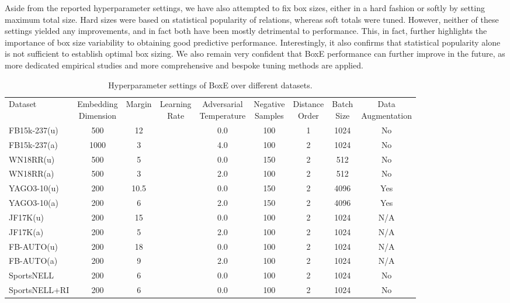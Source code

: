 \documentclass{article}
\begin{document}
Aside from the reported hyperparameter settings, we have also attempted  to fix box sizes, either in a hard fashion or softly by setting maximum total size. Hard sizes were based on statistical popularity of relations, whereas soft totals were tuned. However, neither of these settings yielded any improvements, and in fact both have been mostly detrimental to performance. This, in fact, further highlights the importance of box size variability to obtaining good predictive performance. Interestingly, it also confirms that statistical popularity alone is not sufficient to establish optimal box sizing. We also remain very confident that BoxE performance can further improve in the future, as more dedicated empirical studies and more comprehensive and bespoke tuning methods are applied. 
\begin{table}[t!] 
	\centering
	\caption{Hyperparameter settings of BoxE over different datasets.} 
	\label{tab:HPSettings} 
	\small\addtolength{\tabcolsep}{-1pt}
	\begin{tabular}{l@{\hskip 6pt}c@{\hskip 4pt}c@{\hskip 4pt}c@{\hskip 4pt}c@{\hskip 4pt}c@{\hskip 4pt}c@{\hskip 4pt}c@{\hskip 4pt}c@{\hskip 4pt}}
		\toprule 
		Dataset & \makecell[l]{Embedding \\ Dimension} & Margin & \makecell[l]{Learning \\ Rate} & \makecell[l]{Adversarial \\ Temperature} & \makecell[l]{Negative \\Samples } & \makecell[l]{Distance \\ Order} & \makecell[l]{Batch \\ Size} & \makecell[l]{Data \\ Augmentation}\\
		\cmidrule{2-9}
		FB15k-237(u) & 500 & 12 &  & 0.0 & 100 & 1 & 1024 & No\\
		FB15k-237(a) & 1000 & 3 &  & 4.0 & 100 & 2 & 1024 & No\\
		WN18RR(u) & 500 & 5 &  & 0.0 & 150 & 2 & 512 & No\\
		WN18RR(a) & 500 & 3 &  & 2.0 & 100 & 2 & 512 & No\\
		YAGO3-10(u) & 200 & 10.5 &  & 0.0 & 150 & 2 & 4096 & Yes\\
		YAGO3-10(a) & 200 & 6 &  & 2.0 & 150 & 2 & 4096 & Yes\\
		JF17K(u) & 200 & 15 &  & 0.0 & 100 & 2 & 1024 & N/A\\
		JF17K(a) & 200 & 5 &  & 2.0 & 100 & 2 & 1024& N/A\\
		FB-AUTO(u) & 200 & 18 &  & 0.0 & 100 & 2 & 1024 & N/A\\
		FB-AUTO(a) & 200 & 9 &  & 2.0 & 100 & 2 & 1024 & N/A\\
		SportsNELL & 200 & 6 &  & 0.0 & 100 & 2 & 1024 & No\\
		SportsNELL+RI & 200 & 6 &  & 0.0 & 100 & 2 & 1024& No\\
		\bottomrule
	\end{tabular}
\end{table}
\end{document}
